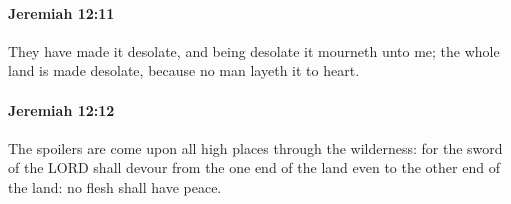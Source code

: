 		\paragraph{Jeremiah 12:11} %
			\label{JEREMIAH-12-11}

			They have made it desolate, and being desolate it mourneth unto me; the whole land is made desolate, because no man layeth it to heart.


		\paragraph{Jeremiah 12:12} %
			\label{JEREMIAH-12-12}

			The spoilers are come upon all high places through the wilderness: for the sword of the LORD shall devour from the one end of the land even to the other end of the land: no flesh shall have peace.


